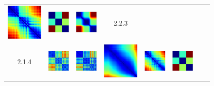 \documentclass[bachelor, nocolorlinks, printoneside]{seuthesis} %
\begin{document}
\begin{Main}
\begin{figure}[ht!]
\begin{centering}
\begin{tabular}{cccc|cccc}
        \includegraphics[width=0.12\columnwidth,keepaspectratio]{figs/toy_triangle/cluster_converge_3by16_3_1.png} &
        \includegraphics[width=0.12\columnwidth,keepaspectratio]{figs/toy_triangle/cluster_converge_3by16_3_2.png} &
        \includegraphics[width=0.12\columnwidth,keepaspectratio]{figs/toy_triangle/cluster_converge_3by16_3_3.png} & 2.2.3\\
        2.1.4 &\includegraphics[width=0.12\columnwidth,keepaspectratio]{figs/toy_triangle/cluster_converge_3by30_4_1.png} &
        \includegraphics[width=0.12\columnwidth,keepaspectratio]{figs/toy_triangle/cluster_converge_3by30_4_2.png} &
        \includegraphics[width=0.12\columnwidth,keepaspectratio]{figs/toy_triangle/cluster_converge_3by30_4_3.png} &  
        \includegraphics[width=0.12\columnwidth,keepaspectratio]{figs/toy_triangle/cluster_converge_3by16_4_1.png} &
        \includegraphics[width=0.12\columnwidth,keepaspectratio]{figs/toy_triangle/cluster_converge_3by16_4_2.png} &

\end{tabular}
\end{centering}
\end{figure}
\end{Main}
\end{document}
